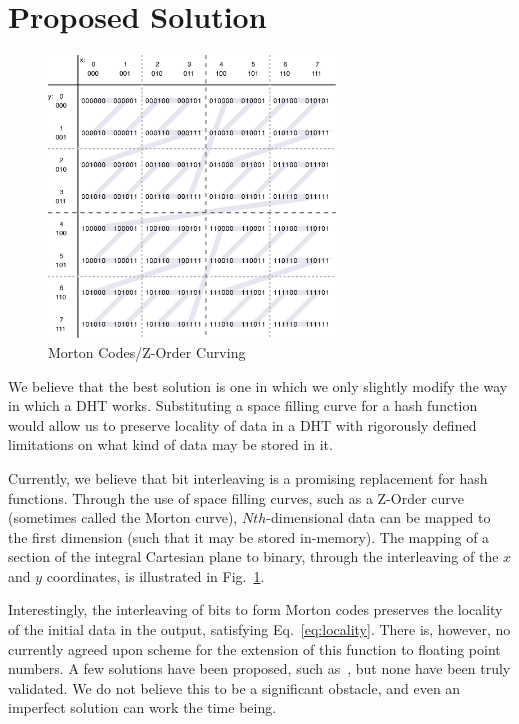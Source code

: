\documentclass[10pt]{IEEEtran}
\begin{document}
\section{Proposed Solution}
\begin{figure}[!t]
\centering
\includegraphics[width=3in]{ZCurve}
\caption{Morton Codes/Z-Order Curving}
\label{fig_MCode}
\end{figure}

\par We believe that the best solution is one in which we only slightly modify the way in which a DHT works. Substituting a space filling curve for a hash function would allow us to preserve locality of data in a DHT with rigorously defined limitations on what kind of data may be stored in it.

\par Currently, we believe that bit interleaving is a promising replacement for hash functions. Through the use of space filling curves, such as a Z-Order curve (sometimes called the Morton curve), $Nth$-dimensional data can be mapped to the first dimension (such that it may be stored in-memory). The mapping of a section of the integral Cartesian plane to binary, through the interleaving of the $x$ and $y$ coordinates, is illustrated in Fig.~\ref{fig_MCode}.

\par Interestingly, the interleaving of bits to form Morton codes preserves the locality of the initial data in the output, satisfying Eq.~\ref{eq:locality}. There is, however, no currently agreed upon scheme for the extension of this function to floating point numbers. A few solutions have been proposed, such as~\cite{Connor:2010eq}, but none have been truly validated. We do not believe this to be a significant obstacle, and even an imperfect solution can work the time being.
\end{document}
